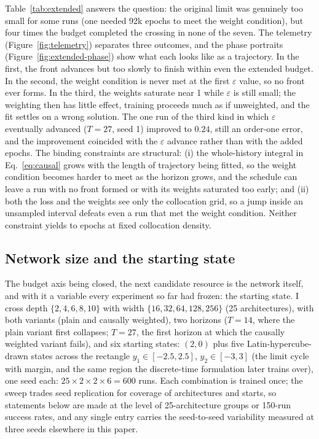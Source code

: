 \documentclass[11pt,a4paper]{article}
\begin{document}
Table~\ref{tab:extended} answers the question: the original limit was
genuinely too small for some runs (one needed 92k epochs to meet the
weight condition), but four times the budget completed the crossing in
none of the seven. The telemetry (Figure~\ref{fig:telemetry}) separates
three outcomes, and the phase portraits
(Figure~\ref{fig:extended-phase}) show what each looks like as a
trajectory. In the first, the front advances but too slowly to finish
within even the extended budget. In the second, the weight condition is
never met at the first $\varepsilon$ value, so no front ever forms. In
the third, the weights saturate near 1 while $\varepsilon$ is still
small; the weighting then has little effect, training proceeds much as
if unweighted, and the fit settles on a wrong solution. The one run of
the third kind in which $\varepsilon$ eventually advanced ($T=27$,
seed 1) improved to $0.24$, still an order-one error, and the
improvement coincided with the $\varepsilon$ advance rather than with
the added epochs. The binding constraints are structural: (i) the
whole-history integral in Eq.~\eqref{eq:causal} grows with the length of
trajectory being fitted, so the weight condition becomes harder to meet
as the horizon grows, and the schedule can leave a run with no front
formed or with its weights saturated too early; and (ii) both the loss
and the weights see only the collocation grid, so a jump inside an
unsampled interval defeats even a run that met the weight condition.
Neither constraint yields to epochs at fixed collocation density.

\subsection{Network size and the starting state}
\label{sec:size-start}

The budget axis being closed, the next candidate resource is the network
itself, and with it a variable every experiment so far had frozen: the
starting state. I cross depth $\{2,4,6,8,10\}$ with width
$\{16,32,64,128,256\}$ (25 architectures), with both variants
(plain and causally weighted), two horizons ($T=14$, where the plain
variant first collapses; $T=27$, the first horizon at which the causally
weighted variant fails), and six starting
states: $(2,0)$ plus five Latin-hypercube-drawn states across the
rectangle $y_1 \in [-2.5, 2.5]$, $y_2 \in [-3, 3]$ (the limit cycle with
margin, and the same region the discrete-time formulation later trains
over), one seed each: $25 \times 2 \times 2 \times 6 = 600$ runs. Each
combination is trained once; the sweep trades seed replication for
coverage of architectures and starts, so statements below are made at
the level of 25-architecture groups or 150-run success rates, and any
single entry carries the seed-to-seed variability measured at three
seeds elsewhere in this paper.
\end{document}
